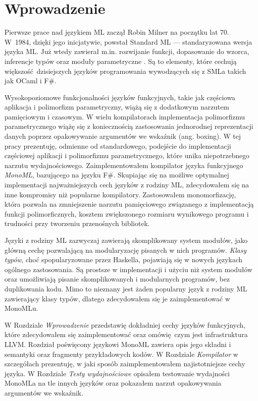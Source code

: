 \documentclass[declaration,shortabstract]{iithesis}
\author         {Mateusz Lewko}
\date           {}                     %
\begin{document}

\chapter{Wprowadzenie}
Pierwsze prace nad językiem ML zaczął Robin Milner na początku lat 70. W~1984, 
dzięki jego inicjatywie, powstał Standard ML --- standaryzowana wersja języka 
ML. Już wtedy zawierał m.in. rozwijanie funkcji, dopasowanie do wzorca, 
inferencje typów oraz moduły parametryczne \cite{sml_proposal}. Są to elementy,
które cechują większość dzisiejszych języków programowania 
wywodzących się z SMLa takich jak OCaml i F\#. 

Wysokopoziomowe funkcjonalności
języków funkcyjnych, takie jak częściowa aplikacja i polimorfizm parametryczny, 
wiążą się z dodatkowym narzutem pamięciowym i czasowym. W wielu kompilatorach 
implementacja polimorfizmu parametrycznego wiążę się z koniecznością 
zastosowania jednorodnej reprezentacji danych poprzez opakowywanie argumentów 
we wskaźnik (ang. boxing). W tej pracy prezentuję, odmienne od standardowego,
podejście do implementacji częściowej aplikacji i polimorfizmu parametrycznego, 
które unika niepotrzebnego narzutu wydajnościowego. Zaimplementowałem kompilator 
języka funkcyjnego \textit{MonoML}, bazującego na języku F\#. 
Skupiając się na możliwe optymalnej implementacji najważniejszych cech języków 
z rodziny ML, zdecydowałem się na inne kompromisy niż popularne kompilatory. 
Zastosowałem monomorfizację, która pozwala na zmniejszenie narzutu pamięciowego 
związanego z implementacją funkcji polimorficznych, kosztem zwiększonego 
rozmiaru wynikowego programu i trudności przy tworzeniu przenośnych 
bibliotek.

Języki z rodziny ML zazwyczaj zawierają skomplikowany system modułów, jako 
główną cechę pozwalającą na modularyzację pisanych w nich programów.
\textit{Klasy typów}, choć spopularyzowane przez Haskella, pojawiają
się w nowych językach ogólnego zastosowania. Są prostsze w implementacji
i użyciu niż system modułów oraz umożliwiają pisanie skomplikowanych i modularnych 
programów, bez duplikowania kodu. Mimo to nieznany jest żaden 
popularny język z rodziny ML zawierający klasy typów, dlatego zdecydowałem się je 
zaimplementować w MonoMLu.

W Rozdziale \textit{Wprowadzenie} przedstawię dokładniej cechy języków funkcyjnych, 
które zdecydowałem się zaimplementować oraz omówię czym jest infrastruktura LLVM. 
Rozdział poświęcony językowi MonoML zawiera opis jego składni i semantyki oraz 
fragmenty przykładowych kodów. W Rozdziale \textit{Kompilator} w szczegółach
prezentuję, w jaki sposób zaimplementowałem najistotniejsze cechy języka.
W Rozdziale \textit{Testy wydajnościowe} opisałem testowanie wydajności MonoMLa
na tle innych języków oraz pokazałem narzut opakowywania argumentów we wskaźnik.
\end{document}
